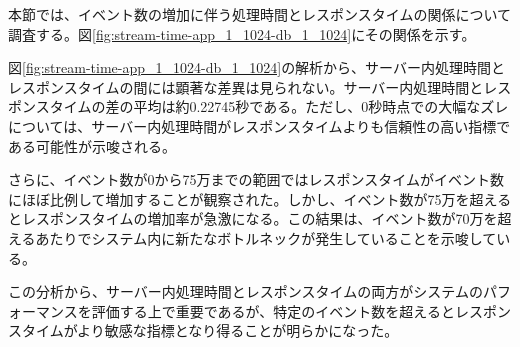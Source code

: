 \documentclass[../../../../../main]{subfiles}
\begin{document}
    \label{subsubsec:result-streaming-only-limit-time}

    本節では、イベント数の増加に伴う処理時間とレスポンスタイムの関係について調査する。図\ref{fig:stream-time-app_1_1024-db_1_1024}にその関係を示す。

    

    図\ref{fig:stream-time-app_1_1024-db_1_1024}の解析から、サーバー内処理時間とレスポンスタイムの間には顕著な差異は見られない。サーバー内処理時間とレスポンスタイムの差の平均は約0.22745秒である。ただし、0秒時点での大幅なズレについては、サーバー内処理時間がレスポンスタイムよりも信頼性の高い指標である可能性が示唆される。

    さらに、イベント数が0から75万までの範囲ではレスポンスタイムがイベント数にほぼ比例して増加することが観察された。しかし、イベント数が75万を超えるとレスポンスタイムの増加率が急激になる。この結果は、イベント数が70万を超えるあたりでシステム内に新たなボトルネックが発生していることを示唆している。

    この分析から、サーバー内処理時間とレスポンスタイムの両方がシステムのパフォーマンスを評価する上で重要であるが、特定のイベント数を超えるとレスポンスタイムがより敏感な指標となり得ることが明らかになった。
\end{document}
